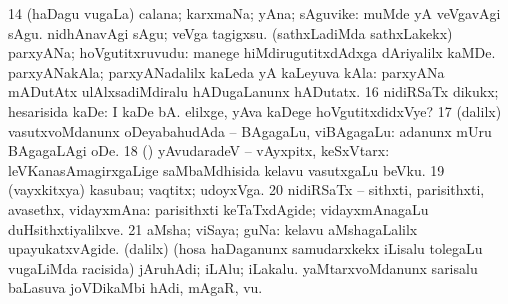 \num{14} (haDagu \mo vugaLa) calana; karxmaNa; yAna; sAguvike:  muMde yA veVgavAgi sAgu.  nidhAnavAgi sAgu; veVga tagigxsu. 
\banum
{} (sathxLadiMda sathxLakekx) parxyANa; hoVgutitxruvudu:  manege hiMdirugutitxdAdxga dAriyalilx kaMDe. 
 parxyANakAla; parxyANadalilx kaLeda yA kaLeyuva kAla:  parxyANa mADutAtx ulAlxsadiMdiralu hADugaLanunx hADutatx. 
\eanum
\numie
\num{16} nidiRSaTx dikukx; hesarisida kaDe:  I kaDe bA.  elilxge, yAva kaDege hoVgutitxdidxVye? 
\num{17} (\bava dalilx) vasutxvoMdanunx oDeyabahudAda -- BAgagaLu, viBAgagaLu:  adanunx mUru BAgagaLAgi oDe. 
\num{18} (\AmA) yAvudaradeV -- vAyxpitx, keSxVtarx:  leVKanasAmagirxgaLige saMbaMdhisida kelavu vasutxgaLu beVku. 
\num{19} (vayxkitxya) kasubau; vaqtitx; udoyxVga. 
\num{20} nidiRSaTx -- sithxti, parisithxti, avasethx, vidayxmAna:  parisithxti keTaTxdAgide; vidayxmAnagaLu duHsithxtiyalilxve. 
\num{21} aMsha; viSaya; guNa:  kelavu aMshagaLalilx upayukatxvAgide. 
 (\bava dalilx) 
\banum
{} (hosa haDaganunx samudarxkekx iLisalu tolegaLu \mo vugaLiMda racisida) jAruhAdi; iLAlu; iLakalu. 
 yaMtarxvoMdanunx sarisalu baLasuva joVDikaMbi hAdi, mAgaR, \mo vu. 
\eanum
\numie
\enum
\emng

